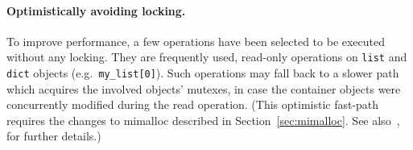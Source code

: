 \paragraph{Optimistically avoiding locking.}
To improve performance, a few operations have been selected to be executed without any locking.
They are frequently used, read-only operations on \texttt{list} and \texttt{dict} objects (e.g.\ \texttt{{my\_list[0]}}).
Such operations may fall back to a slower path which acquires the involved objects' mutexes, in case the container objects were concurrently modified during the read operation.
(This optimistic fast-path requires the changes to mimalloc described in Section~\ref{sec:mimalloc}.
See also~\cite[\S Optimistically Avoiding Locking]{pep703}, for further details.)
